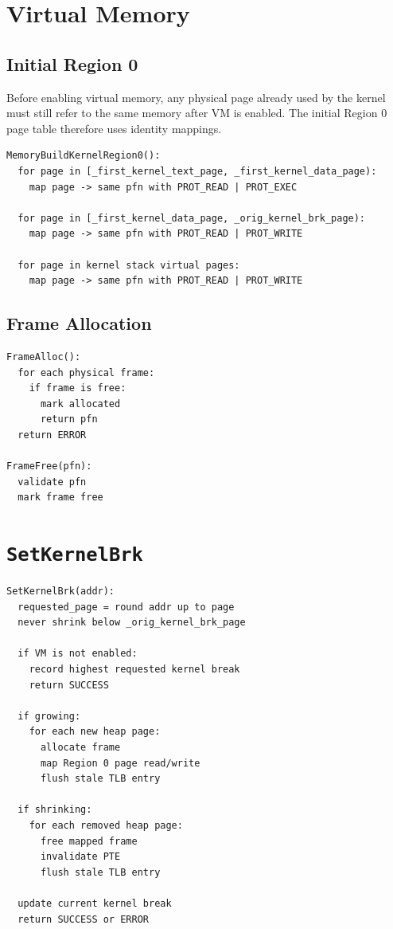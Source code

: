 \documentclass[11pt]{article}
\begin{document}
\section{Virtual Memory}

\subsection{Initial Region 0}

Before enabling virtual memory, any physical page already used by the kernel must still
refer to the same memory after VM is enabled. The initial Region 0 page table therefore
uses identity mappings.

\begin{lstlisting}[style=yalnixpseudo]
MemoryBuildKernelRegion0():
  for page in [_first_kernel_text_page, _first_kernel_data_page):
    map page -> same pfn with PROT_READ | PROT_EXEC

  for page in [_first_kernel_data_page, _orig_kernel_brk_page):
    map page -> same pfn with PROT_READ | PROT_WRITE

  for page in kernel stack virtual pages:
    map page -> same pfn with PROT_READ | PROT_WRITE
\end{lstlisting}

\subsection{Frame Allocation}

\begin{lstlisting}[style=yalnixpseudo]
FrameAlloc():
  for each physical frame:
    if frame is free:
      mark allocated
      return pfn
  return ERROR

FrameFree(pfn):
  validate pfn
  mark frame free
\end{lstlisting}

\section{\texttt{SetKernelBrk}}

\begin{lstlisting}[style=yalnixpseudo]
SetKernelBrk(addr):
  requested_page = round addr up to page
  never shrink below _orig_kernel_brk_page

  if VM is not enabled:
    record highest requested kernel break
    return SUCCESS

  if growing:
    for each new heap page:
      allocate frame
      map Region 0 page read/write
      flush stale TLB entry

  if shrinking:
    for each removed heap page:
      free mapped frame
      invalidate PTE
      flush stale TLB entry

  update current kernel break
  return SUCCESS or ERROR
\end{lstlisting}
\end{document}
